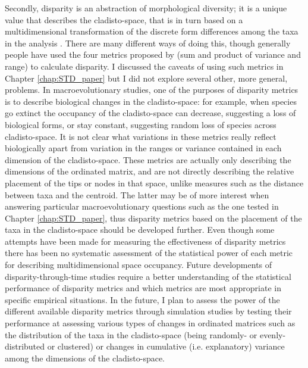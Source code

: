 Secondly, disparity is an abstraction of morphological diversity; it is a unique value that describes the cladisto-space, that is in turn based on a multidimensional transformation of the discrete form differences among the taxa in the analysis \citep{Wills1994,foote1997evolution}.
There are many different ways of doing this, though generally people have used the four metrics proposed by \cite{Wills1994} (sum and product of variance and range) to calculate disparity.
I discussed the caveats of using such metrics in Chapter \ref{chap:STD_paper} but I did not explore several other, more general, problems.
In macroevolutionary studies, one of the purposes of disparity metrics is to describe biological changes in the cladisto-space: for example, when species go extinct the occupancy of the cladisto-space can decrease, suggesting a loss of biological forms, or stay constant, suggesting random loss of species across cladisto-space.
It is not clear what variations in these metrics really reflect biologically apart from variation in the ranges or variance contained in each dimension of the cladisto-space.
These metrics are actually only describing the dimensions of the ordinated matrix, and are not directly describing the relative placement of the tips or nodes in that space, unlike measures such as the distance between taxa and the centroid. 
The latter may be of more interest when answering particular macroevolutionary questions such as the one tested in Chapter \ref{chap:STD_paper}, thus disparity metrics based on the placement of the taxa in the cladisto-space should be developed further.
Even though some attempts have been made for measuring the effectiveness of disparity metrics \citep{Ciampaglio2001} there has been no systematic assessment of the statistical power of each metric for describing multidimensional space occupancy.
Future developments of disparity-through-time studies require a better understanding of the statistical performance of disparity metrics and which metrics are most appropriate in specific empirical situations.
In the future, I plan to assess the power of the different available disparity metrics \citep[e.g.][]{Wills1994,Ciampaglio2004,Hughes20082013,huang2015origins} through simulation studies by testing their performance at assessing various types of changes in ordinated matrices such as the distribution of the taxa in the cladisto-space (being randomly- or evenly-distributed or clustered) or changes in cumulative (i.e. explanatory) variance among the dimensions of the cladisto-space.

